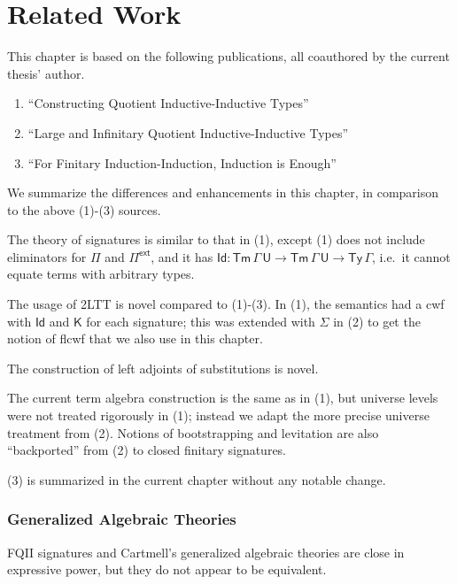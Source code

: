 \documentclass[12pt,a4paper,twoside,openany]{book}
\theoremstyle{remark}
\theoremstyle{definition}
\theoremstyle{theorem}
\newcommand{\Tm}{\mathsf{Tm}}
\newcommand{\Ty}{\mathsf{Ty}}
\newcommand{\U}{\mathsf{U}}
\newcommand{\Id}{\mathsf{Id}}
\newcommand{\Pie}{\Pi^{\mathsf{ext}}}
\newcommand{\K}{\mathsf{K}}
\begin{document}
\section{Related Work}
\label{sec:fqii-related-work}

This chapter is based on the following publications, all coauthored by the
current thesis' author.
\begin{enumerate}
  \item ``Constructing Quotient Inductive-Inductive Types'' \cite{kaposi2019constructing}
  \item ``Large and Infinitary Quotient Inductive-Inductive Types'' \cite{iqiit}
  \item ``For Finitary Induction-Induction, Induction is Enough'' \cite{ind-ind-reduction}
\end{enumerate}
We summarize the differences and enhancements in this chapter, in comparison to the above
(1)-(3) sources.

The theory of signatures is similar to that in (1), except (1) does not include
eliminators for $\Pi$ and $\Pie$, and it has $\Id : \Tm\,\Gamma\,\U \to
\Tm\,\Gamma\,\U \to \Ty\,\Gamma$, i.e.\ it cannot equate terms with arbitrary
types.

The usage of 2LTT is novel compared to (1)-(3). In (1), the semantics had a cwf
with $\Id$ and $\K$ for each signature; this was extended with $\Sigma$ in (2)
to get the notion of flcwf that we also use in this chapter.

The construction of left adjoints of substitutions is novel.

The current term algebra construction is the same as in (1), but universe levels
were not treated rigorously in (1); instead we adapt the more precise universe
treatment from (2). Notions of bootstrapping and levitation are also
``backported'' from (2) to closed finitary signatures.

(3) is summarized in the current chapter without any notable change.

\subsubsection{Generalized Algebraic Theories}

FQII signatures and Cartmell's generalized algebraic theories \cite{gat} are
close in expressive power, but they do not appear to be equivalent.
\end{document}
